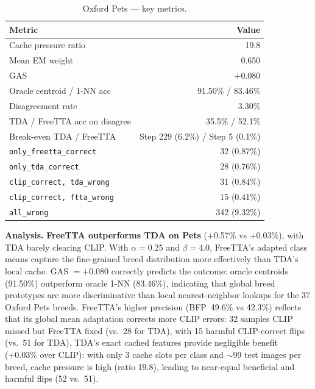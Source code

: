 \documentclass[12pt,a4paper]{article}
\newcommand{\1}{\mathbf{1}}
\begin{document}
\begin{table}[H]
\centering
\caption{Oxford Pets --- key metrics.}
\label{tab:pets_internal}
\begin{tabular}{@{}lr@{}}
\toprule
Metric & Value \\
\midrule
Cache pressure ratio         & 19.8 \\
Mean EM weight               & 0.650 \\
GAS                          & $+0.080$ \\
Oracle centroid / 1-NN acc   & 91.50\% / 83.46\% \\
Disagreement rate            & 3.30\% \\
TDA / FreeTTA acc on disagree & 35.5\% / 52.1\% \\
Break-even TDA / FreeTTA     & Step 229 (6.2\%) / Step 5 (0.1\%) \\
\texttt{only\_freetta\_correct} & 32 (0.87\%) \\
\texttt{only\_tda\_correct}     & 28 (0.76\%) \\
\texttt{clip\_correct, tda\_wrong} & 31 (0.84\%) \\
\texttt{clip\_correct, ftta\_wrong} & 15 (0.41\%) \\
\texttt{all\_wrong}             & 342 (9.32\%) \\
\bottomrule
\end{tabular}
\end{table}

\textbf{Analysis.}
\textbf{FreeTTA outperforms TDA on Pets} (+0.57\% vs +0.03\%), with TDA barely clearing CLIP.
With $\alpha=0.25$ and $\beta=4.0$, FreeTTA's adapted class means capture the fine-grained breed distribution more effectively than TDA's local cache.
GAS $= +0.080$ correctly predicts the outcome: oracle centroids (91.50\%) outperform oracle 1-NN (83.46\%), indicating that global breed prototypes are more discriminative than local nearest-neighbor lookups for the 37 Oxford Pets breeds.
FreeTTA's higher precision (BFP~49.6\% vs 42.3\%) reflects that its global mean adaptation corrects more CLIP errors: 32 samples CLIP missed but FreeTTA fixed (vs.\ 28 for TDA), with 15 harmful CLIP-correct flips (vs.\ 51 for TDA).
TDA's exact cached features provide negligible benefit (+0.03\% over CLIP): with only 3 cache slots per class and $\sim$99 test images per breed, cache pressure is high (ratio 19.8), leading to near-equal beneficial and harmful flips (52 vs.\ 51).

\end{document}
